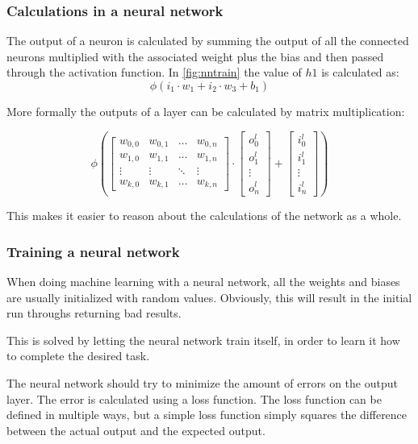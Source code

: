 \subsubsection{Calculations in a neural network}

The output of a neuron is calculated by summing the output of all the connected neurons multiplied with the associated weight plus the bias and then passed through the activation function.
In \autoref{fig:nntrain} the value of $h1 $ is calculated as:
$$\phi(i_1 \cdot w_1 + i_2 \cdot w_3 + b_1)$$


More formally the outputs of a layer can be calculated by matrix multiplication:

$$
\phi\left(
\begin{bmatrix}
w_{0,0} & w_{0,1} & \dots  & w_{0,n} \\
w_{1,0} & w_{1,1} & \dots  & w_{1,n} \\
\vdots & \vdots & \ddots & \vdots \\
w_{k,0} & w_{k,1} & \dots  & w_{k,n}
\end{bmatrix}
\cdot
\begin{bmatrix}
o^l_0\\
o^l_1\\
\vdots \\
o^l_n
\end{bmatrix}
+
\begin{bmatrix}
i^l_0\\
i^l_1\\
\vdots \\
i^l_n
\end{bmatrix}
\right)
$$

This makes it easier to reason about the calculations of the network as a whole.

\subsubsection{Training a neural network}\label{training-a-neural-network}
When doing machine learning with a neural network, all the weights and biases are usually initialized with random values.
Obviously, this will result in the initial run throughs returning bad results.

This is solved by letting the neural network train itself, in order to learn it how to complete the desired task.

The neural network should try to minimize the amount of errors on the output layer.
The error is calculated using a loss function.
The loss function can be defined in multiple ways, but a simple loss function simply squares the difference between the actual output and the expected output.

